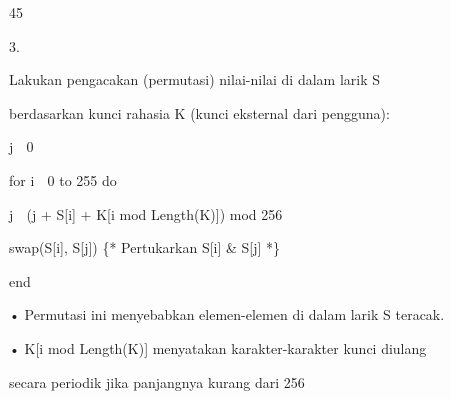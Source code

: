 \documentclass{article}
\begin{document}

45

3.

Lakukan pengacakan (permutasi) nilai-nilai di dalam larik S  

berdasarkan kunci rahasia K (kunci eksternal dari pengguna):


j  0


for i  0 to 255 do

       j  (j + S[i] + K[i  mod Length(K)]) mod 256

       swap(S[i], S[j]) \{* Pertukarkan S[i] \& S[j] *\}

     end

• Permutasi ini menyebabkan elemen-elemen di dalam larik S teracak. 

• K[i mod Length(K)] menyatakan karakter-karakter kunci diulang 

secara periodik jika panjangnya kurang dari 256
\end{document}
